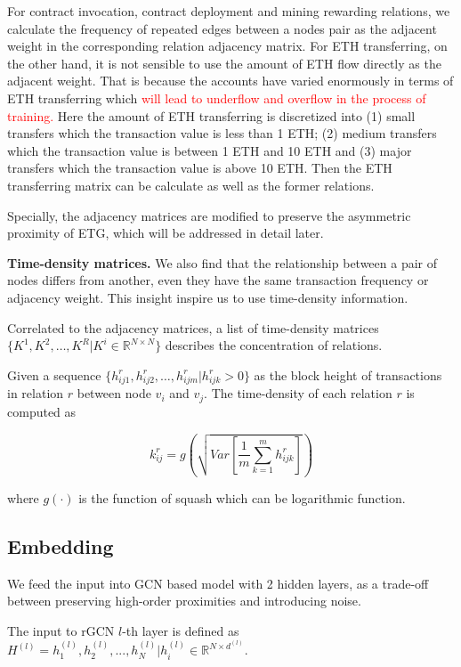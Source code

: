 For contract invocation, contract deployment and mining rewarding relations, we calculate the frequency of repeated edges between a nodes pair as the adjacent weight in the corresponding relation adjacency matrix. For ETH transferring, on the other hand, it is not sensible to use the amount of ETH flow directly as the adjacent weight. That is because the accounts have varied enormously in terms of ETH transferring which \textcolor{red}{will lead to underflow and overflow in the process of training.} Here the amount of ETH transferring is discretized into (1) small transfers which the transaction value is less than 1 ETH; (2) medium transfers which the transaction value is between 1 ETH and 10 ETH and (3) major transfers which the transaction value is above 10 ETH. Then the ETH transferring matrix can be calculate as well as the former relations.

Specially, the adjacency matrices are modified to preserve the asymmetric proximity of ETG, which will be addressed in detail later. 

\textbf{Time-density matrices.} We also find that the relationship between a pair of nodes differs from another, even they have the same transaction frequency or adjacency weight. This insight inspire us to use time-density information.

Correlated to the adjacency matrices, a list of time-density matrices $\{K^1,K^2,\dots,K^R|K^i\in \mathbb{R}^{N \times N}\}$ describes the concentration of relations. 

Given a sequence $\{h_{ij1}^r,h_{ij2}^r,\dots,h_{ijm}^r | h_{ijk}^r>0\}$ as the block height of transactions in relation $r$ between node $v_i$ and $v_j$. The time-density of each relation $r$ is computed as%

\begin{equation}
k_{ij}^r=g(\sqrt{Var[\frac{1}{m}\sum_{k=1}^m h_{ijk}^r]})
\label{eq:time}
\end{equation}

\noindent where $g(\cdot)$ is the function of squash which can be logarithmic function.

\subsection{Embedding}
\label{sec:rGCN layers}
 We feed the input into GCN based model with 2 hidden layers, as a trade-off between preserving high-order proximities and introducing noise.

The input to rGCN $l$-th layer is defined as $H^{(l)}={h_1^{(l)},h_2^{(l)},...,h_N^{(l)}|h_i^{(l)}\in \mathbb{R}^{N \times d^{(l)}}}$.


